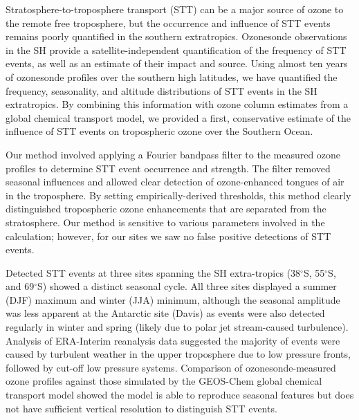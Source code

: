 \documentclass[acp, manuscript]{copernicus} %
\begin{document}
\conclusions  %
%
  
Stratosphere-to-troposphere transport (STT) can be a major source of ozone to the remote free troposphere, but the occurrence and influence of STT events remains poorly quantified in the southern extratropics.
Ozonesonde observations in the SH provide a satellite-independent quantification of the frequency of STT events, as well as an estimate of their impact and source.
Using almost ten years of ozonesonde profiles over the southern high latitudes, we have quantified the frequency, seasonality, and altitude distributions of STT events in the SH extratropics. 
By combining this information with ozone column estimates from a global chemical transport model, we provided a first, conservative estimate of the influence of STT events on tropospheric ozone over the Southern Ocean.

Our method involved applying a Fourier bandpass filter to the measured ozone profiles to determine STT event occurrence and strength.
The filter removed seasonal influences and allowed clear detection of ozone-enhanced tongues of air in the troposphere.
By setting empirically-derived thresholds, this method clearly distinguished tropospheric ozone enhancements that are separated from the stratosphere.
Our method is sensitive to various parameters involved in the calculation; however, for our sites we saw no false positive detections of STT events.

Detected STT events at three sites spanning the SH extra-tropics (38$^{\circ}$S, 55$^{\circ}$S, and 69$^{\circ}$S) showed a distinct seasonal cycle.
All three sites displayed a summer (DJF) maximum and winter (JJA) minimum, although the seasonal amplitude was less apparent at the Antarctic site (Davis) as events were also detected regularly in winter and spring (likely due to polar jet stream-caused turbulence).  %
Analysis of ERA-Interim reanalysis data suggested the majority of events were caused by turbulent weather in the upper troposphere due to low pressure fronts, followed by cut-off low pressure systems.
Comparison of ozonesonde-measured ozone profiles against those simulated by the GEOS-Chem global chemical transport model showed the model is able to reproduce seasonal features but does not have sufficient vertical resolution to distinguish STT events.
\end{document}
